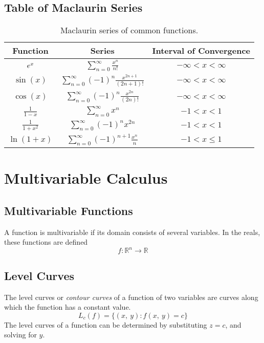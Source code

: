 \documentclass{article}
\begin{document}
\subsection{Table of Maclaurin Series}
\begin{table}[H]
    \centering
    \begin{tabular}{c | c | c}
        \toprule
        \textbf{Function} & \textbf{Series} & \textbf{Interval of Convergence} \\
        \midrule
        $e^{x}$ & $\displaystyle \sum_{n=0}^{\infty} \frac{x^n}{n!}$ & $-\infty < x < \infty$ \\[14pt]
        $\sin{\left( x \right)}$ & $\displaystyle \sum_{n=0}^{\infty} \left( -1 \right)^n \frac{x^{2n+1}}{\left( 2n+1 \right)!}$ & $-\infty < x < \infty$ \\[14pt]
        $\cos{\left( x \right)}$ & $\displaystyle \sum_{n=0}^{\infty} \left( -1 \right)^n \frac{x^{2n}}{\left( 2n \right)!}$ & $-\infty < x < \infty$ \\[14pt]
        $\displaystyle \frac{1}{1-x}$ & $\displaystyle \sum_{n=0}^{\infty} x^n$ & $-1 < x < 1$ \\[14pt]
        $\displaystyle \frac{1}{1+x^2}$ & $\displaystyle \sum_{n=0}^{\infty} \left( -1 \right)^n x^{2n}$ & $-1 < x < 1$ \\[14pt]
        $\displaystyle \ln{\left( 1+x \right)}$ & $\displaystyle \sum_{n=0}^{\infty} \left( -1 \right)^{n+1} \frac{x^n}{n}$ & $-1 < x \leq 1$ \\[14pt]
        \bottomrule
    \end{tabular}
    \caption{Maclaurin series of common functions.}
\end{table}
\newpage
\section{Multivariable Calculus}
\subsection{Multivariable Functions}
\begin{definition}
    A function is multivariable if its domain consists of several variables. In
    the reals, these functions are defined
    \begin{equation*}
        f:\mathbb{R}^n\to\mathbb{R}
    \end{equation*}
\end{definition}
\subsection{Level Curves}
\begin{definition}
    The level curves or \textit{contour curves} of a function of two variables are 
    curves along which the function has a constant value.
    \begin{equation*}
        L_c\left( f \right) = \bigl\{ \left( x,\: y \right) : f\left(x,\: y\right) = c\bigr\}
    \end{equation*}
    The level curves of a function can be determined by substituting $z=c$, and
    solving for $y$.
\end{definition}
\end{document}
